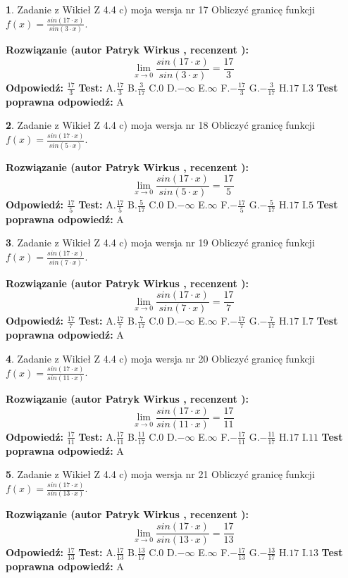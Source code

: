 \documentclass[12pt, a4paper]{article}
\theoremstyle{definition} %
\newtheorem{zad}{}
\newcommand{\zadStart}[1]{\begin{zad}#1\newline}
\newcommand{\zadStop}{\end{zad}}
\newcommand{\rozwStart}[2]{\noindent \textbf{Rozwiązanie (autor #1 , recenzent #2): }\newline}
\newcommand{\rozwStop}{\newline}
\newcommand{\odpStart}{\noindent \textbf{Odpowiedź:}\newline}
\newcommand{\odpStop}{\newline}
\newcommand{\testStart}{\noindent \textbf{Test:}\newline}
\newcommand{\testStop}{\newline}
\newcommand{\kluczStart}{\noindent \textbf{Test poprawna odpowiedź:}\newline}
\newcommand{\kluczStop}{\newline}
\begin{document}
\zadStart{Zadanie z Wikieł Z 4.4 c) moja wersja nr 17}
Obliczyć granicę funkcji $f(x)=\frac{sin(17\cdot x)}{sin(3\cdot x)}$.
\zadStop
\rozwStart{Patryk Wirkus}{}
$$\lim\limits_{x\to 0}\frac{sin(17\cdot x)}{sin(3\cdot x)}=
\frac{17}{3}$$
\rozwStop
\odpStart
$\frac{17}{3}$
\odpStop
\testStart
A.$\frac{17}{3}$
B.$\frac{3}{17}$
C.$0$
D.$-\infty$
E.$\infty$
F.$-\frac{17}{3}$
G.$-\frac{3}{17}$
H.$17$
I.$3$
\testStop
\kluczStart
A
\kluczStop



\zadStart{Zadanie z Wikieł Z 4.4 c) moja wersja nr 18}
Obliczyć granicę funkcji $f(x)=\frac{sin(17\cdot x)}{sin(5\cdot x)}$.
\zadStop
\rozwStart{Patryk Wirkus}{}
$$\lim\limits_{x\to 0}\frac{sin(17\cdot x)}{sin(5\cdot x)}=
\frac{17}{5}$$
\rozwStop
\odpStart
$\frac{17}{5}$
\odpStop
\testStart
A.$\frac{17}{5}$
B.$\frac{5}{17}$
C.$0$
D.$-\infty$
E.$\infty$
F.$-\frac{17}{5}$
G.$-\frac{5}{17}$
H.$17$
I.$5$
\testStop
\kluczStart
A
\kluczStop



\zadStart{Zadanie z Wikieł Z 4.4 c) moja wersja nr 19}
Obliczyć granicę funkcji $f(x)=\frac{sin(17\cdot x)}{sin(7\cdot x)}$.
\zadStop
\rozwStart{Patryk Wirkus}{}
$$\lim\limits_{x\to 0}\frac{sin(17\cdot x)}{sin(7\cdot x)}=
\frac{17}{7}$$
\rozwStop
\odpStart
$\frac{17}{7}$
\odpStop
\testStart
A.$\frac{17}{7}$
B.$\frac{7}{17}$
C.$0$
D.$-\infty$
E.$\infty$
F.$-\frac{17}{7}$
G.$-\frac{7}{17}$
H.$17$
I.$7$
\testStop
\kluczStart
A
\kluczStop



\zadStart{Zadanie z Wikieł Z 4.4 c) moja wersja nr 20}
Obliczyć granicę funkcji $f(x)=\frac{sin(17\cdot x)}{sin(11\cdot x)}$.
\zadStop
\rozwStart{Patryk Wirkus}{}
$$\lim\limits_{x\to 0}\frac{sin(17\cdot x)}{sin(11\cdot x)}=
\frac{17}{11}$$
\rozwStop
\odpStart
$\frac{17}{11}$
\odpStop
\testStart
A.$\frac{17}{11}$
B.$\frac{11}{17}$
C.$0$
D.$-\infty$
E.$\infty$
F.$-\frac{17}{11}$
G.$-\frac{11}{17}$
H.$17$
I.$11$
\testStop
\kluczStart
A
\kluczStop



\zadStart{Zadanie z Wikieł Z 4.4 c) moja wersja nr 21}
Obliczyć granicę funkcji $f(x)=\frac{sin(17\cdot x)}{sin(13\cdot x)}$.
\zadStop
\rozwStart{Patryk Wirkus}{}
$$\lim\limits_{x\to 0}\frac{sin(17\cdot x)}{sin(13\cdot x)}=
\frac{17}{13}$$
\rozwStop
\odpStart
$\frac{17}{13}$
\odpStop
\testStart
A.$\frac{17}{13}$
B.$\frac{13}{17}$
C.$0$
D.$-\infty$
E.$\infty$
F.$-\frac{17}{13}$
G.$-\frac{13}{17}$
H.$17$
I.$13$
\testStop
\kluczStart
A
\kluczStop
\end{document}
